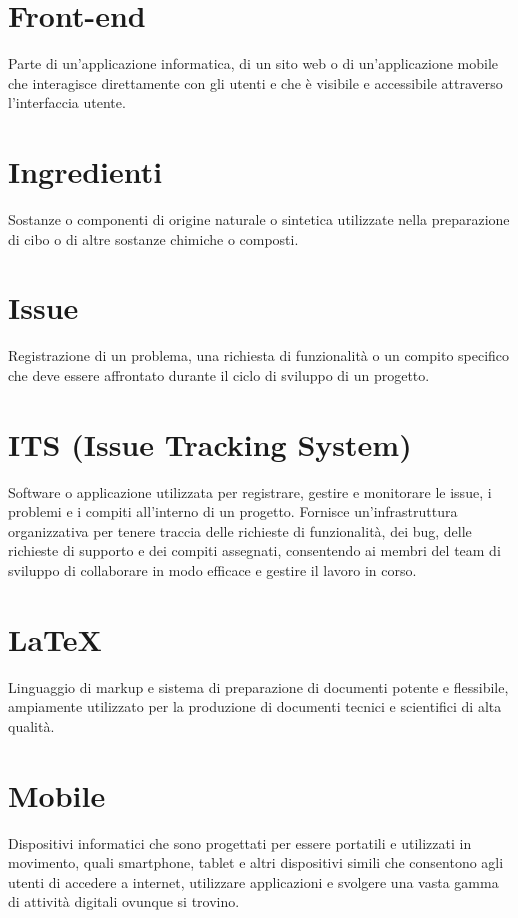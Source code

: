 \section{Front-end}
Parte di un'applicazione informatica, di un sito web o di un'applicazione mobile che interagisce direttamente con gli utenti e che è visibile e accessibile attraverso l'interfaccia utente.

\section{Ingredienti}
Sostanze o componenti di origine naturale o sintetica utilizzate nella preparazione di cibo o di altre sostanze chimiche o composti.

\section{Issue}
Registrazione di un problema, una richiesta di funzionalità o un compito specifico che deve essere affrontato durante il ciclo di sviluppo di un progetto.

\section{ITS (Issue Tracking System)}
Software o applicazione utilizzata per registrare, gestire e monitorare le issue, i problemi e i compiti all'interno di un progetto. Fornisce un'infrastruttura organizzativa per tenere traccia delle richieste di funzionalità, dei bug, delle richieste di supporto e dei compiti assegnati, consentendo ai membri del team di sviluppo di collaborare in modo efficace e gestire il lavoro in corso.

\section{LaTeX}
Linguaggio di markup e sistema di preparazione di documenti potente e flessibile, ampiamente utilizzato per la produzione di documenti tecnici e scientifici di alta qualità.

\section{Mobile}
Dispositivi informatici che sono progettati per essere portatili e utilizzati in movimento, quali smartphone, tablet e altri dispositivi simili che consentono agli utenti di accedere a internet, utilizzare applicazioni e svolgere una vasta gamma di attività digitali ovunque si trovino.

